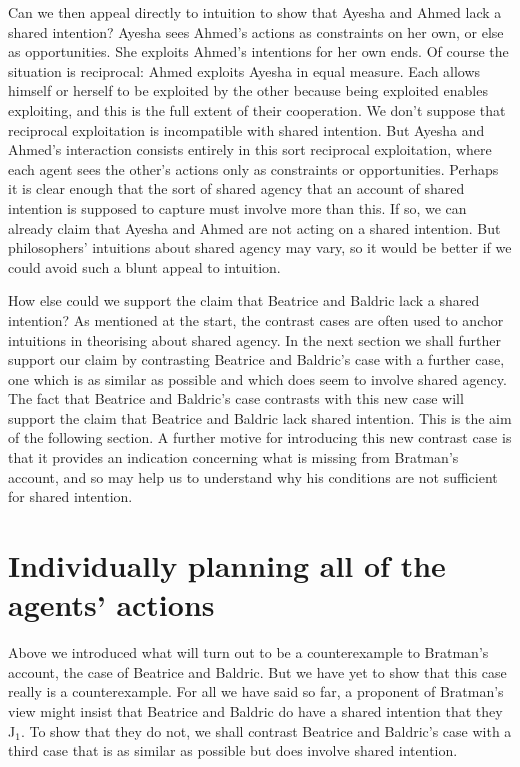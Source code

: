 \documentclass[12pt,\papersize]{extarticle}
\begin{document}
Can we then appeal directly to intuition to show that Ayesha and Ahmed lack a shared intention?
Ayesha sees Ahmed's actions as constraints on her own, or else as opportunities.
She exploits Ahmed's intentions for her own ends.
Of course the situation is reciprocal: Ahmed exploits Ayesha in equal measure.
Each allows himself or herself to be exploited by the other because being exploited enables exploiting,
and this is the full extent of their cooperation. 
We don't suppose that reciprocal exploitation is incompatible with shared intention. 
But Ayesha and Ahmed's interaction consists entirely in this sort reciprocal exploitation, where each agent sees the other's actions only as constraints or opportunities.
Perhaps it is clear enough that 
the sort of shared agency that an account of shared intention is supposed to capture must involve more than this. 
If so, we can already claim that Ayesha and Ahmed are not acting on a shared intention.
But philosophers' intuitions about shared agency may vary, so it would be better if we could avoid such a blunt appeal to intuition.

How else could we support the claim that Beatrice and Baldric lack a shared intention? 
As mentioned at the start, 
the contrast cases are often used to anchor intuitions in theorising about shared agency.
In the next section we shall further support our claim by contrasting Beatrice and Baldric's case with a further case, one which is as similar as possible and which does seem to involve shared agency.
The fact that Beatrice and Baldric's case contrasts with this new case will support the claim that Beatrice and Baldric lack shared intention.
This is the aim of the following section.
A further motive for introducing this new contrast case is that it provides an indication concerning what is missing from Bratman's account, and so may help us to understand why his conditions are not sufficient for shared intention.



\section{Individually planning all of  the agents' actions}
\label{sec:distributed_plan}

Above we introduced what will turn out to be a counterexample to Bratman's account, the case of Beatrice and Baldric. 
But we have yet to show that this case really is a counterexample. 
For all we have said so far, a proponent of Bratman's view might insist that Beatrice and Baldric do have a shared intention that they J$_1$.
To show that they do not,
we shall contrast Beatrice and Baldric's case with a third case that is as similar as possible but does involve shared intention. 
\end{document}
